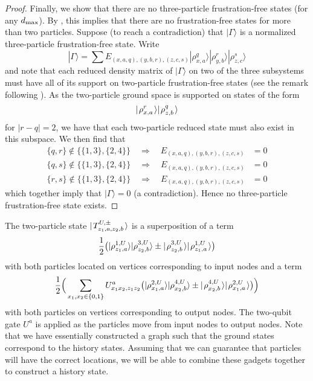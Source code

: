\documentclass[../thesis-main/thesis-main]{subfiles}
\begin{document}
\begin{proof}
Finally, we show that there are no three-particle frustration-free states (for any $d_{\text{max}}$). By , this implies that there are no frustration-free states for more than two particles. Suppose (to reach a contradiction) that $|\Gamma\rangle$ is a normalized three-particle frustration-free state. Write
\begin{equation}
|\Gamma\rangle=\sum E_{(x,a,q),(y,b,r),(z,c,s)}|\rho_{x,a}^{q}\rangle|\rho_{y,b}^{r}\rangle|\rho_{z,c}^{s}\rangle
\end{equation}
and note that each reduced density matrix of $|\Gamma\rangle$ on two of the three subsystems must have all of its support on two-particle frustration-free states (see the remark following ). As the two-particle ground space is supported on states of the form
\begin{equation}
  |\mspace{2mu} \rho_{x,a}^r \mspace{2mu} \rangle|\mspace{2mu} \rho_{z,b}^{q} \mspace{2mu} \rangle
\end{equation}
for $|r-q| = 2$, we have that each two-particle reduced state must also exist in this subspace.  We then find that
\begin{align}
\{q,r\}\notin\{\{1,3\},\{2,4\}\}\quad\Longrightarrow\quad E_{(x,a,q),(y,b,r),(z,c,s)} & =0\\
\{q,s\}\notin\{\{1,3\},\{2,4\}\}\quad\Longrightarrow\quad E_{(x,a,q),(y,b,r),(z,c,s)} & =0\\
\{r,s\}\notin\{\{1,3\},\{2,4\}\}\quad\Longrightarrow\quad E_{(x,a,q),(y,b,r),(z,c,s)} & =0
\end{align}
which together imply that $|\Gamma\rangle=0$ (a contradiction). Hence no three-particle frustration-free state exists.
\end{proof}




The two-particle state $|\mspace{2mu} T_{z_{1},a,z_{2},b}^{U,\pm} \mspace{2mu} \rangle$ is a superposition of a term
\begin{equation}
  \frac{1}{2}\big(|\rho_{z_{1},a}^{1,U}\rangle|\rho_{z_{2},b}^{3,U}\rangle \pm |\mspace{2mu} \rho_{z_2,b}^{3,U} \mspace{2mu} \rangle|\mspace{2mu} \rho_{z_1,a}^{1,U} \mspace{2mu} \rangle\big)
\end{equation}
with both particles located on vertices corresponding to input nodes and a term 
\begin{equation}
  \frac{1}{2}\Big(\sum_{x_{1},x_{2}\in\{0,1\}}U^a_{x_{1}x_{2},z_{1}z_{2}}\big(|\rho_{x_{1},a}^{2,U}\rangle|\rho_{x_{2},b}^{4,U}\rangle \pm |\mspace{2mu} \rho_{x_2,b}^{4,U} \mspace{2mu} \rangle|\mspace{2mu} \rho_{x_1,a}^{2,U} \mspace{2mu} \rangle\big)\Big)
\end{equation}
with both particles on vertices corresponding to output nodes. The two-qubit gate $U^a$
is applied as the particles move from input nodes to output nodes.  Note that we have essentially constructed a graph such that the ground states correspond to the history states.  Assuming that we can guarantee that particles will have the correct locations, we will be able to combine these gadgets together to construct a history state.
\end{document}
